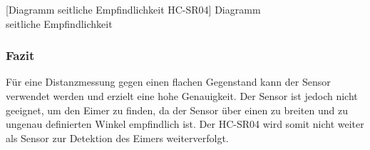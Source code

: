 \begin{minipage}{\textwidth}
\begin{minipage}{0.5\textwidth}
        [Diagramm seitliche Empfindlichkeit HC-SR04]
        {Diagramm \\ seitliche Empfindlichkeit}
\end{minipage}
\end{minipage}

\subsubsection{Fazit}
Für eine Distanzmessung gegen einen flachen Gegenstand kann der Sensor
verwendet werden und erzielt eine hohe Genauigkeit. Der Sensor ist jedoch 
nicht geeignet, um den Eimer zu finden, da der Sensor über einen zu breiten 
und zu ungenau definierten Winkel empfindlich ist. Der HC-SR04 wird somit 
nicht weiter als Sensor zur Detektion des Eimers weiterverfolgt. 

